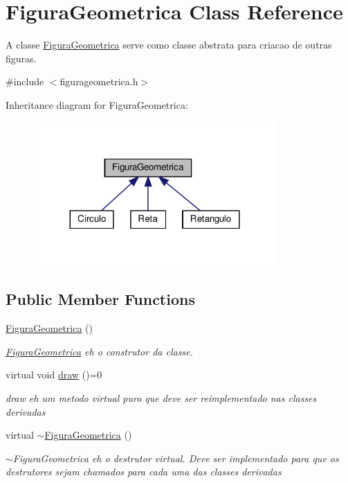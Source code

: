 \hypertarget{class_figura_geometrica}{}\section{Figura\+Geometrica Class Reference}
\label{class_figura_geometrica}


A classe \hyperlink{class_figura_geometrica}{Figura\+Geometrica} serve como classe abstrata para criacao de outras figuras.  




{\ttfamily \#include $<$figurageometrica.\+h$>$}



Inheritance diagram for Figura\+Geometrica\+:\nopagebreak
\begin{figure}[H]
\begin{center}
\leavevmode
\includegraphics[width=263pt]{class_figura_geometrica__inherit__graph}
\end{center}
\end{figure}
\subsection*{Public Member Functions}
\begin{DoxyCompactItemize}
\item 
\hyperlink{class_figura_geometrica_a81d7c7efaea511e60a15f5a363138dd9}{Figura\+Geometrica} ()
\begin{DoxyCompactList}\small\item\em \hyperlink{class_figura_geometrica}{Figura\+Geometrica} eh o construtor da classe. \end{DoxyCompactList}\item 
virtual void \hyperlink{class_figura_geometrica_a727cea2befcb22b2457c088127fe041d}{draw} ()=0
\begin{DoxyCompactList}\small\item\em draw eh um metodo virtual puro que deve ser reimplementado nas classes derivadas \end{DoxyCompactList}\item 
virtual \hyperlink{class_figura_geometrica_ad13b9bccf1b14f6b9fbc662aad61ffd1}{$\sim$\+Figura\+Geometrica} ()
\begin{DoxyCompactList}\small\item\em $\sim$\+Figura\+Geometrica eh o destrutor virtual. Deve ser implementado para que os destrutores sejam chamados para cada uma das classes derivadas \end{DoxyCompactList}\end{DoxyCompactItemize}



